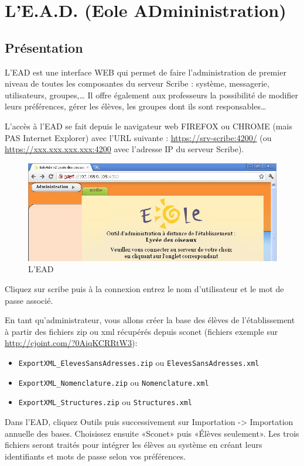 \documentclass{article}
\makeatletter
\def\maxwidth{\ifdim\Gin@nat@width>\linewidth\linewidth
\else\Gin@nat@width\fi}
\let\Oldincludegraphics\includegraphics
\renewcommand{\includegraphics}[1]{\Oldincludegraphics[width=\maxwidth]{#1}}
\makeatother
\begin{document}
\section{L'E.A.D. (Eole ADmininistration)}

\subsection{Présentation}

L'EAD est une interface WEB qui permet de faire l'administration de
premier niveau de toutes les composantes du serveur Scribe : système,
messagerie, utilisateurs, groupes,\ldots{} Il offre également aux
professeurs la possibilité de modifier leurs préférences, gérer les
élèves, les groupes dont ils sont responsables\ldots{}

L'accès à l'EAD se fait depuis le navigateur web FIREFOX ou CHROME (mais
PAS Internet Explorer) avec l'URL suivante :
\url{https://srv-scribe:4200/} (ou \url{https://xxx.xxx.xxx.xxx:4200}
avec l'adresse IP du serveur Scribe).

\begin{figure}[htbp]
\centering
\includegraphics{scribe_html_661f3efb.jpg}
\caption{L'EAD}
\end{figure}

Cliquez sur scribe puis à la connexion entrez le nom d'utilisateur et le
mot de passe associé.

En tant qu'administrateur, vous allons créer la base des élèves de
l'établissement à partir des fichiers zip ou xml récupérés depuis sconet
(fichiers exemple sur \url{http://cjoint.com/?0AiqKCRRtW3}):

\begin{itemize}
\item
  \lstinline!ExportXML_ElevesSansAdresses.zip! ou
  \lstinline!ElevesSansAdresses.xml!
\item
  \lstinline!ExportXML_Nomenclature.zip! ou \lstinline!Nomenclature.xml!
\item
  \lstinline!ExportXML_Structures.zip! ou \lstinline!Structures.xml!
\end{itemize}
Dans l'EAD, cliquez Outils puis successivement sur Importation
-\textgreater{} Importation annuelle des bases. Choisissez ensuite
«Sconet» puis «Élèves seulement». Les trois fichiers seront traités pour
intégrer les élèves au système en créant leurs identifiants et mots de
passe selon vos préférences.
\end{document}
